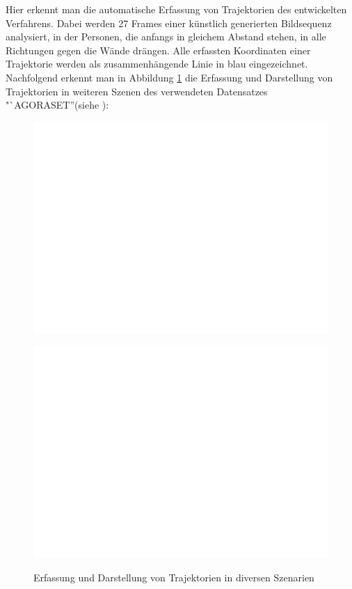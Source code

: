 Hier erkennt man die automatische Erfassung von Trajektorien des entwickelten Verfahrens. Dabei werden 27 Frames einer künstlich generierten Bildsequenz analysiert, in der Personen, die anfangs in gleichem Abstand stehen, in alle Richtungen gegen die Wände drängen. Alle erfassten Koordinaten einer Trajektorie werden als zusammenhängende Linie in blau eingezeichnet. Nachfolgend erkennt man in Abbildung \ref{trajektorien_scenes} die Erfassung und Darstellung von Trajektorien in weiteren Szenen des verwendeten Datensatzes "`AGORASET''(siehe \cite{CourtyPRL2014} \cite{Allain2012ICPR}):
\bigskip
\begin{figure}[H]
\centering
  \begin{minipage}{0.45\textwidth}
    \includegraphics[width=\textwidth]{images/dummy.png}
    \label{a)}
  \end{minipage}
  \begin{minipage}{0.45\textwidth}
    \includegraphics[width=\textwidth]{images/dummy.png}
    \label{b)}
  \end{minipage}
\caption{Erfassung und Darstellung von Trajektorien in diversen Szenarien \cite{CourtyPRL2014} \cite{Allain2012ICPR}}
\label{trajektorien_scenes}
\end{figure}

